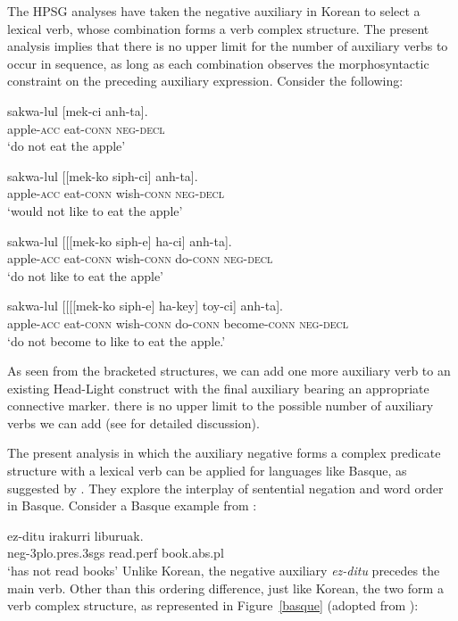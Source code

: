 \documentclass[output=paper
                ,modfonts
                		,nonflat
	        ,collection
	        ,collectionchapter
	        ,collectiontoclongg
 	        ,biblatex
                ,babelshorthands
                ,newtxmath
                ,draftmode
                ,colorlinks, citecolor=brown
]{./langsci/langscibook}
\begin{document}
{\begin{exe}
\begin{xlist}
The HPSG analyses have taken the negative auxiliary in Korean
to select a lexical verb, whose combination forms a verb complex
structure. The present analysis implies that there is no upper limit for the
number of auxiliary verbs to
occur in sequence, as long as each combination observes
the morphosyntactic constraint on the preceding auxiliary expression. Consider
the following:

\eal\ex \gll sakwa-lul [mek-ci anh-ta]. \\
apple-\textsc{acc} eat-\textsc{conn} \textsc{neg}-\textsc{decl} \\
\trans`do not eat the apple'

\ex \gll sakwa-lul [[mek-ko siph-ci] anh-ta]. \\
apple-\textsc{acc} eat-\textsc{conn} wish-\textsc{conn} \textsc{neg}-\textsc{decl} \\
\trans`would not like to eat the apple'

\ex \label{20c} \gll sakwa-lul [[[mek-ko siph-e] ha-ci] anh-ta]. \\
apple-\textsc{acc} eat-\textsc{conn} wish-\textsc{conn} do-\textsc{conn} \textsc{neg}-\textsc{decl} \\
\trans`do not like to eat the apple'

\ex \gll sakwa-lul [[[[mek-ko siph-e] ha-key] toy-ci] anh-ta]. \\
apple-\textsc{acc} eat-\textsc{conn} wish-\textsc{conn} do-\textsc{conn} become-\textsc{conn} \textsc{neg}-\textsc{decl} \\
\trans`do not become to like to eat the apple.'
\end{xlist} \end{exe}
%
As seen from the bracketed structures, we can add one more auxiliary verb to
an existing Head-Light construct with the final auxiliary bearing an appropriate
  connective marker. there is no upper limit to the possible number  of auxiliary
  verbs we can add (see \citet{Kim:16} for detailed discussion).

The present analysis in which the auxiliary negative forms a complex
predicate structure with a lexical verb can be applied for languages
like Basque, as suggested by \citet{CB:11}. They explore the interplay of sentential
negation and word order in Basque. Consider
a Basque example from \citet{CB:11}:

\ea
\label{basque-ex}
\gll ez-ditu irakurri liburuak. \\
     {\sc neg}-3{\sc plo.pres.3sgs} read.{\sc perf} book.{\sc abs.pl}\\
\glt `has not read books'
\z
%
%
Unlike Korean, the negative auxiliary \textit{ez-ditu} precedes
the main verb. Other than this ordering difference, just
like Korean, the two form a verb complex structure, as represented in
Figure~\ref{basque} (adopted from \citet{CB:11}):

}
\end{document}
